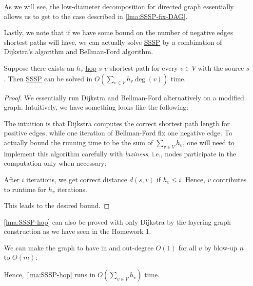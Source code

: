 \begin{intuition}
	As we will see, the \hyperref[thm:directed-LDD]{low-diameter decomposition for directed graph} essentially allows us to get to the case described in \autoref{lma:SSSP-fix-DAG}.
\end{intuition}

Lastly, we note that if we have some bound on the number of negative edges shortest paths will have, we can actually solve \hyperref[prb:SSSP]{SSSP} by a combination of Dijkstra's algorithm and Bellman-Ford algorithm.

\begin{lemma}\label{lma:SSSP-hop}
	Suppose there exists an \(h_v\)-\hyperref[not:hop]{hop} \(s\)-\(v\) shortest path for every \(v \in V\) with the source \(s\). Then \hyperref[prb:SSSP]{SSSP} can be solved in \(O(\sum_{v \in V} h_v \deg(v))\) time.
\end{lemma}
\begin{proof}
	We essentially run Dijkstra and Bellman-Ford alternatively on a modified graph. Intuitively, we have something looks like the following:
	\begin{center}
	\end{center}
	The intuition is that Dijkstra computes the correct shortest path length for positive edges, while one iteration of Bellman-Ford fix one negative edge. To actually bound the running time to be the sum of \(\sum_{v \in V} h_v\), one will need to implement this algorithm carefully with \emph{laziness}, i.e., nodes participate in the computation only when necessary:
	\begin{claim}
		After \(i\) iterations, we get correct distance \(d(s, v)\) if \(h_v \leq i\). Hence, \(v\) contributes to runtime for \(h_v\) iterations.
	\end{claim}
	This leads to the desired bound.
\end{proof}

\begin{remark}
	\autoref{lma:SSSP-hop} can also be proved with only Dijkstra by the layering graph construction as we have seen in the Homework 1.
\end{remark}

\begin{remark}
	We can make the graph to have in and out-degree \(O(1)\) for all \(v\) by blow-up \(n\) to \(\Theta (m)\):
	\begin{center}
	\end{center}
	Hence, \autoref{lma:SSSP-hop} runs in \(O(\sum_{v \in V} h_v)\) time.
\end{remark}
